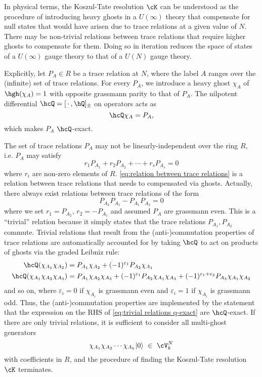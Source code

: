 \documentclass[a4paper,12pt]{article}
\begin{document}
In physical terms, the Koszul-Tate resolution $\cK$ can be understood as the procedure of introducing heavy ghosts in a $U(\infty)$ theory that compensate for null states that would have arisen due to trace relations at a given value of $N$. There may be non-trivial relations between trace relations that require higher ghosts to compensate for them. Doing so in iteration reduces the space of states of a $U(\infty)$ gauge theory to that of a $U(N)$ gauge theory.

Explicitly, let $P_A \in R$ be a trace relation at $N$, where the label $A$ ranges over the (infinite) set of trace relations. For every $P_A$, we introduce a heavy ghost $\chi_A$ of $\hgh(\chi_A) = 1$ with opposite grassmann parity to that of $P_A$. The nilpotent differential $\hcQ = [ \, \cdot \,, \hQ]_\pm$ on operators acts as
\begin{equation}
\hcQ \chi_{A} = P_A,
\end{equation}
which makes $P_A$ $\hcQ$-exact.

The set of trace relations $P_A$ may not be linearly-independent over the ring $R$, i.e. $P_A$ may satisfy
\begin{equation} \label{eq:relation between trace relations}
r_1 P_{A_1} + r_2 P_{A_2} + \cdots + r_s P_{A_s} = 0
\end{equation}
where $r_i$ are non-zero elements of $R$. \eqref{eq:relation between trace relations} is a relation between trace relations that needs to compensated via ghosts. Actually, there always exist relations between trace relations of the form
\begin{equation}
P_{A_2} P_{A_1} -P_{A_1} P_{A_2} = 0
\end{equation}
where we set $r_1 = P_{A_2}, \, r_2 = -P_{A_1}$ and assumed $P_A$ are grassmann even. This is a ``trivial'' relation because it simply states that the trace relations $P_{A_1}, P_{A_2}$ commute. Trivial relations that result from the (anti-)commutation properties of trace relations are automatically accounted for by taking $\hcQ$ to act on products of ghosts via the graded Leibniz rule:
\begin{align} \label{eq:trivial relations q-exact}
    \hcQ ( \chi_{A_1} \chi_{A_2} ) &= P_{A_1} \chi_{A_2} + (-1)^{\varepsilon_1} P_{A_2} \chi_{A_1} \nonumber \\
    \hcQ (\chi_{A_1} \chi_{A_2} \chi_{A_3}) &= P_{A_1} \chi_{A_2} \chi_{A_3} + (-1)^{\varepsilon_1} P_{A_2} \chi_{A_1} \chi_{A_3} + (-1)^{\varepsilon_1 + \varepsilon_2} P_{A_3} \chi_{A_1} \chi_{A_2} 
\end{align}
and so on, where $\varepsilon_i=0$ if $\chi_{A_i}$ is grassmann even and $\varepsilon_i=1$ if $\chi_{A_i}$ is grassmann odd. Thus, the (anti-)commutation properties are implemented by the statement that the expression on the RHS of \eqref{eq:trivial relations q-exact} are $\hcQ$-exact. If there are only trivial relations, it is sufficient to consider all multi-ghost generators
\begin{equation}
\chi_{A_1} \chi_{A_2} \cdots \chi_{A_k} |0\rangle \ \in \ \cV_k^N
\end{equation}
with coefficients in $R$, and the procedure of finding the Koszul-Tate resolution $\cK$ terminates.
\end{document}
